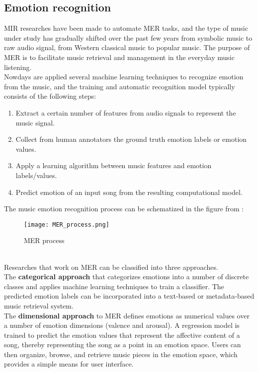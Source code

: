 \subsection{Emotion recognition}
MIR researches have been made to automate MER tasks, and the type of music under study has gradually shifted over the past few years from symbolic music to raw audio signal, from Western classical music to popular music. The purpose of MER is to facilitate music retrieval and management in the everyday music listening.
\\ \indent
Nowdays are applied several machine learning techniques to recognize emotion from the music, and the training and automatic recognition model typically consists of the following steps:
\begin{enumerate}
	\item Extract a certain number of features from audio signals to represent the music signal.
	\item Collect from human annotators the ground truth emotion labels or emotion values.
	\item Apply a learning algorithm between music features and emotion labels/values.
	\item Predict emotion of an input song from the resulting computational model.
\end{enumerate}
The music emotion recognition process can be schematized in the figure from \cite{yang2018review}:
\begin{figure}[h]
    \centering
    \texttt{[image: MER\_process.png]} 
	\caption{MER process}
    \label{fig:MER_process}
\end{figure}
\\
Researches that work on MER can be classified into three approaches.
\\ \indent
The \textbf{categorical approach} that categorizes emotions into a number of discrete classes and applies machine learning techniques to train a classifier. The predicted emotion labels can be incorporated into a text-based or metadata-based music retrieval system.
\\ \indent
The \textbf{dimensional approach} to MER defines emotions as numerical values over a number of emotion dimensions (valence and arousal). A regression model is trained to predict the emotion values that represent the affective content of a song, thereby representing the song as a point in an emotion space. Users can then organize, browse, and retrieve music pieces in the emotion space, which provides a simple means for user interface.

